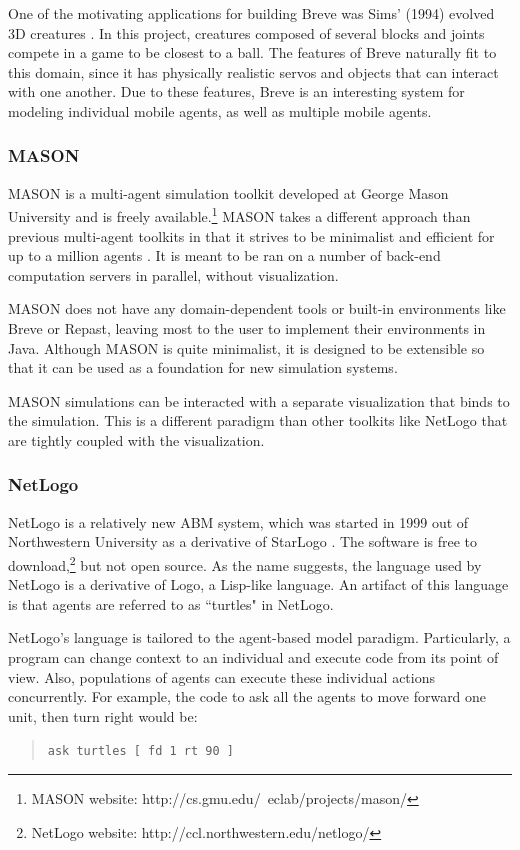 One of the motivating applications for building Breve was Sims' (1994) evolved 3D creatures \cite{kleinbreve}.
In this project, creatures composed of several blocks and joints compete in a game to be closest to a ball.
The features of Breve naturally fit to this domain, since it has physically realistic servos and objects that can interact with one another.
Due to these features, Breve is an interesting system for modeling individual mobile agents, as well as multiple mobile agents.



\subsubsection{MASON}
MASON is a multi-agent simulation toolkit developed at George Mason University and is freely available.\footnote{MASON website: http://cs.gmu.edu/~eclab/projects/mason/}
MASON takes a different approach than previous multi-agent toolkits in that it strives to be minimalist and efficient for up to a million agents \cite{Luke}.
It is meant to be ran on a number of back-end computation servers in parallel, without visualization.

MASON does not have any domain-dependent tools or built-in environments like Breve or Repast, leaving most to the user to implement their environments in Java.
Although MASON is quite minimalist, it is designed to be extensible so that it can be used as a foundation for new simulation systems.

MASON simulations can be interacted with a separate visualization that binds to the simulation.
This is a different paradigm than other toolkits like NetLogo that are tightly coupled with the visualization.


\subsubsection{NetLogo}
NetLogo is a relatively new ABM system, which was started in 1999 out of Northwestern University as a derivative of StarLogo \cite{tisue2004netlogo}.
The software is free to download,\footnote{NetLogo website: http://ccl.northwestern.edu/netlogo/} but not open source.
As the name suggests, the language used by NetLogo is a derivative of Logo, a Lisp-like language.
An artifact of this language is that agents are referred to as ``turtles" in NetLogo.

NetLogo's language is tailored to the agent-based model paradigm.
Particularly, a program can change context to an individual and execute code from its point of view.
Also, populations of agents can execute these individual actions concurrently.
For example, the code to ask all the agents to move forward one unit, then turn right would be:
\begin{quote}\texttt{\small ask turtles [ fd 1 rt 90 ]}\end{quote}

